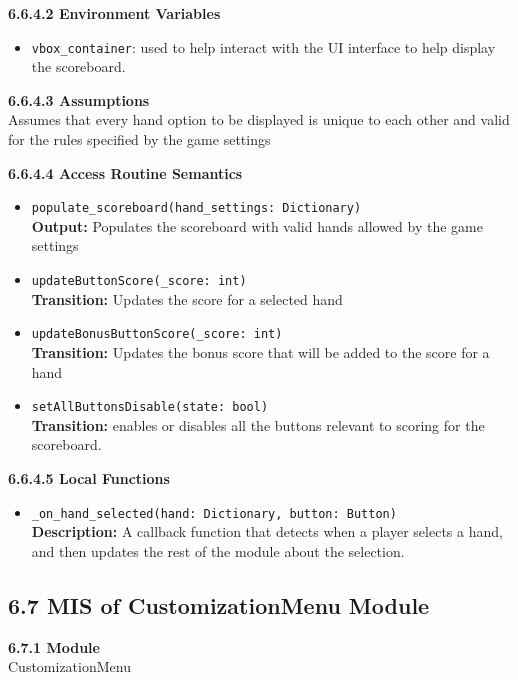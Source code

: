 \documentclass[12pt, titlepage]{article}
\begin{document}
\textbf{6.6.4.2 Environment Variables}

\begin{itemize}
	\item \texttt{vbox\_container}: used to help interact with the UI interface to help display the scoreboard. 
\end{itemize}

\textbf{6.6.4.3 Assumptions}\\
Assumes that every hand option to be displayed is unique to each other and valid for the rules specified by the game settings

\textbf{6.6.4.4 Access Routine Semantics}
\begin{itemize}

	\item \texttt{populate\_scoreboard(hand\_settings: Dictionary)}\\
	\textbf{Output:} Populates the scoreboard with valid hands allowed by the game settings
	
	
	\item \texttt{updateButtonScore(\_score: int)}\\
	\textbf{Transition:} Updates the score for a selected hand
	
	
	\item \texttt{updateBonusButtonScore(\_score: int)}\\
	\textbf{Transition:} Updates the bonus score that will be added to the score for a hand
	
	
	\item \texttt{setAllButtonsDisable(state: bool)}\\
	\textbf{Transition:} enables or disables all the buttons relevant to scoring for the scoreboard.
	
	


\end{itemize}

\textbf{6.6.4.5 Local Functions}

\begin{itemize}
    \item \texttt{\_on\_hand\_selected(hand: Dictionary, button: Button)}\\
    \textbf{Description:} A callback function that detects when a player selects a hand, and then updates the rest of the module about the selection.

\end{itemize}


\subsection*{6.7 MIS of CustomizationMenu Module}
\textbf{6.7.1 Module}\\
 CustomizationMenu\\
\end{document}
